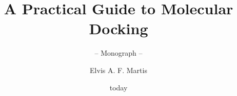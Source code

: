 \documentclass[graybox,envcountchap,sectrefs]{svmono}
\date{today}
\begin{document}
\author{Elvis A. F. Martis}
\title{A Practical Guide to Molecular Docking}
\subtitle{-- Monograph --}
\maketitle

\frontmatter%






\tableofcontents




\mainmatter%
%


















\backmatter%






\printindex

\end{document}
